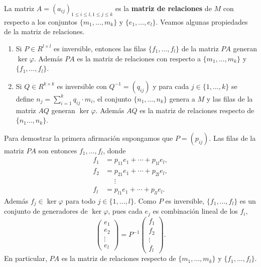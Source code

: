 La matriz $A=(a_{ij})_{1\leq i\leq l,1\leq j\leq k}$ es la 
\textbf{matriz de relaciones} de $M$ con respecto a los conjuntos $\{m_1,\dots,m_k\}$ y $\{e_1,\dots,e_l\}$. 
Veamos algunas propiedades de la matriz de relaciones.
\begin{enumerate}
\item Si $P\in R^{l\times l}$ es inversible, entonces las filas $\{f_1,\dots,f_l\}$ de la matriz $PA$ generan $\ker\varphi$. Además $PA$ es la matriz de relaciones
con respecto a $\{m_1,\dots,m_k\}$ y $\{f_1,\dots,f_l\}$. 
\item Si $Q\in R^{k\times k}$ es inversible con 
$Q^{-1}=(q_{ij})$ y para cada
$j\in\{1,\dots,k\}$ se define  
$n_j=\sum_{i=1}^k q_{ij}\cdot m_i$, el conjunto $\{n_1,\dots,n_k\}$ genera a $M$ y las 
filas de la matriz $AQ$ generan $\ker\varphi$. Además $AQ$ es la matriz de relaciones respecto de $\{n_1\dots,n_k\}$.  
\end{enumerate}

Para demostrar la primera afirmación supongamos que $P=(p_{ij})$. Las filas de la matriz $PA$ son entonces
$f_1,\dots,f_l$, donde 
\begin{align*}
f_1 &= p_{11}e_1+\cdots+p_{1l}e_l,\\
f_2 &= p_{21}e_1+\cdots+p_{2l}e_l,\\
&\phantom{=}\vdots\\
f_l &= p_{l1}e_1+\cdots+p_{ll}e_l.	
\end{align*}
Además $f_j\in\ker\varphi$ para todo $j\in\{1,\dots,l\}$. 
Como $P$ es inversible, $\{f_1,\dots,f_l\}$ es un conjunto de generadores de $\ker\varphi$, pues
cada $e_j$ es combinación lineal de los $f_i$,  
\[
\begin{pmatrix}
e_1\\
e_2\\
\vdots\\
e_l	
\end{pmatrix}
=P^{-1}\begin{pmatrix}
f_1\\
f_2\\
\vdots\\
f_l
\end{pmatrix}.
\]
En particular, $PA$ es la matriz de relaciones respecto de $\{m_1,\dots,m_k\}$ y $\{f_1,\dots,f_l\}$.  

